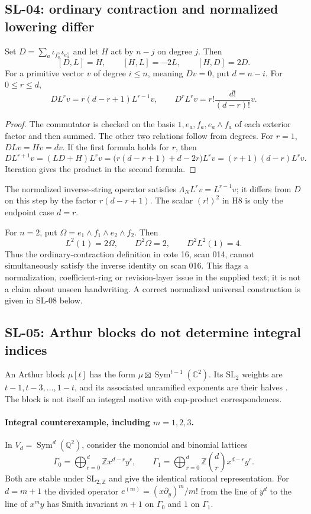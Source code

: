 \documentclass[11pt,a4paper]{article}
\theoremstyle{remark}
\begin{document}
\subsection{SL-04: ordinary contraction and normalized lowering differ}
\label{sl:contraction}

Set $D=\sum_a\iota_{f_a^\vee}\iota_{e_a^\vee}$ and let $H$ act by
$n-j$ on degree $j$.  Then
\[
 [D,L]=H,\qquad[H,L]=-2L,\qquad[H,D]=2D.
\]
For a primitive vector $v$ of degree $i\le n$, meaning $Dv=0$, put
$d=n-i$.  For $0\le r\le d$,
\[
 DL^rv=r(d-r+1)L^{r-1}v,\qquad
 D^rL^rv=r!\frac{d!}{(d-r)!}v.
\]
\begin{proof}
The commutator is checked on the basis $1,e_a,f_a,e_a\wedge f_a$ of
each exterior factor and then summed.  The other two relations follow from
degrees.  For $r=1$, $DLv=Hv=dv$.  If the first formula holds for $r$, then
\[
 DL^{r+1}v=(LD+H)L^rv
 =\bigl(r(d-r+1)+d-2r\bigr)L^rv
 =(r+1)(d-r)L^rv.
\]
Iteration gives the product in the second formula.
\end{proof}
The normalized inverse-string operator satisfies
$\Lambda_N L^rv=L^{r-1}v$; it differs from $D$ on this step by the
factor $r(d-r+1)$.  The scalar $(r!)^2$ in H8 is only the endpoint case
$d=r$.

For $n=2$, put $\Omega=e_1\wedge f_1\wedge e_2\wedge f_2$.  Then
\[
 L^2(1)=2\Omega,\qquad D^2\Omega=2,\qquad D^2L^2(1)=4.
\]
Thus the ordinary-contraction definition in cote 16, scan 014, cannot
simultaneously satisfy the inverse identity on scan 016.  This flags a
normalization, coefficient-ring or revision-layer issue in the supplied
text; it is not a claim about unseen handwriting.  A correct normalized
universal construction is given in SL-08 below.

\subsection{SL-05: Arthur blocks do not determine integral indices}
\label{sl:arthur-lattice}

An Arthur block $\mu[t]$ has the form
$\mu\boxtimes\operatorname{Sym}^{t-1}(\mathbb C^2)$.  Its $\mathrm{SL}_2$
weights are $t-1,t-3,\ldots,1-t$, and its associated unramified exponents
are their halves \cite[\S2.3, equation (2.3.1)]{Mok}.  The block is not
itself an integral motive with cup-product correspondences.

\paragraph{Integral counterexample, including $m=1,2,3$.}
In $V_d=\operatorname{Sym}^d(\mathbb Q^2)$, consider the monomial and
binomial lattices
\[
 \Gamma_0=\bigoplus_{r=0}^d\mathbb Zx^{d-r}y^r,\qquad
 \Gamma_1=\bigoplus_{r=0}^d
             \mathbb Z\binom drx^{d-r}y^r.
\]
Both are stable under $\mathrm{SL}_{2,\mathbb Z}$ and give the identical
rational representation.  For $d=m+1$ the divided operator
$e^{(m)}=(x\partial_y)^m/m!$ from the line of $y^d$ to the line of
$x^my$ has Smith invariant $m+1$ on $\Gamma_0$ and $1$ on $\Gamma_1$.
\end{document}
